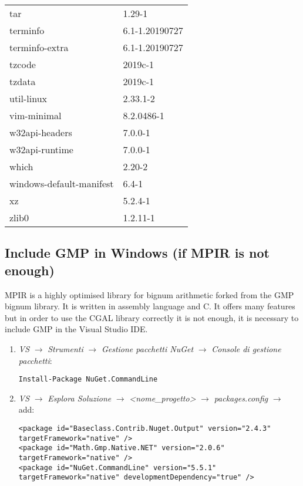 \documentclass[11pt, english, openany]{report}
\begin{document}
\begin{appendices}
\begin{center}
\begin{tabular}{|m{3cm}|m{3cm}|}
tar & 1.29-1 \\
terminfo & 6.1-1.20190727 \\
terminfo-extra & 6.1-1.20190727 \\
tzcode & 2019c-1 \\
tzdata & 2019c-1 \\
util-linux & 2.33.1-2 \\
vim-minimal & 8.2.0486-1 \\
w32api-headers & 7.0.0-1 \\
w32api-runtime & 7.0.0-1 \\
which & 2.20-2 \\
windows-default-manifest & 6.4-1 \\
xz & 5.2.4-1 \\
zlib0 & 1.2.11-1 \\
\hline
\end{tabular}
\end{center}

\subsection{Include GMP in Windows (if MPIR is not enough)}
MPIR is a highly optimised library for bignum arithmetic forked from the GMP bignum library. It is written in assembly language and C. It offers many features but in order to use the CGAL library correctly it is not enough, it is necessary to include GMP in the Visual Studio IDE.
\begin{enumerate}
\item \textit{VS} $\rightarrow$ \textit{Strumenti} $\rightarrow$ \textit{Gestione pacchetti NuGet} $\rightarrow$ \textit{Console di gestione pacchetti}:
	
\begin{lstlisting}
Install-Package NuGet.CommandLine
\end{lstlisting}	

\item \textit{VS} $\rightarrow$ \textit{Esplora Soluzione} $\rightarrow$ \textit{<nome\_progetto>} $\rightarrow$ \textit{packages.config} $\rightarrow$ add: 

\begin{lstlisting}
<package id="Baseclass.Contrib.Nuget.Output" version="2.4.3" targetFramework="native" />
<package id="Math.Gmp.Native.NET" version="2.0.6" targetFramework="native" />
<package id="NuGet.CommandLine" version="5.5.1" targetFramework="native" developmentDependency="true" />
\end{lstlisting}
		


\end{enumerate}
\end{appendices}
\end{document}
